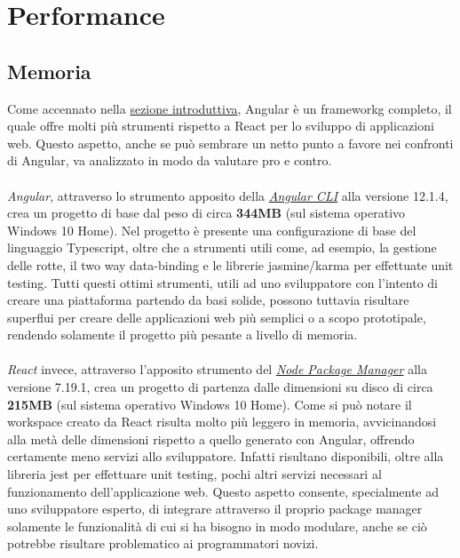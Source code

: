 
\section{Performance}
\label{subsec:performance}

\subsection{Memoria}
\label{sec:performance}
Come accennato nella \hyperref[sec:introduzione]{sezione introduttiva}, Angular è un \gls{frameworkg} completo, il quale offre molti più strumenti rispetto a React per lo sviluppo di applicazioni web. Questo aspetto, anche se può sembrare un netto punto a favore nei confronti di Angular, va analizzato in modo da valutare pro e contro. \\ \\
\textit{Angular}, attraverso lo strumento apposito della \hyperref[sec:linguaggio-programmazione]{\textsl{Angular CLI}} alla versione 12.1.4, crea un progetto di base dal peso di circa \textbf{344MB} (sul sistema operativo Windows 10 Home). Nel progetto è presente una configurazione di base del linguaggio Typescript, oltre che a strumenti utili come, ad esempio, la gestione delle rotte, il two way data-binding e le librerie jasmine/karma per effettuate unit testing. Tutti questi ottimi strumenti, utili ad uno sviluppatore con l'intento di creare una piattaforma partendo da basi solide, possono tuttavia risultare superflui per creare delle applicazioni web più semplici o a scopo prototipale, rendendo solamente il progetto più pesante a livello di memoria. \\ \\
\textit{React} invece, attraverso l'apposito strumento del \hyperref[sec:linguaggio-programmazione]{\textsl{Node Package Manager}} alla versione 7.19.1, crea un progetto di partenza dalle dimensioni su disco di circa \textbf{215MB} (sul sistema operativo Windows 10 Home). Come si può notare il workspace creato da React risulta molto più leggero in memoria, avvicinandosi alla metà delle dimensioni rispetto a quello generato con Angular, offrendo certamente meno servizi allo sviluppatore. Infatti risultano disponibili, oltre alla libreria jest per effettuare unit testing, pochi altri servizi necessari al funzionamento dell'applicazione web. Questo aspetto consente, specialmente ad uno sviluppatore esperto, di integrare attraverso il proprio package manager solamente le funzionalità di cui si ha bisogno in modo modulare, anche se ciò potrebbe risultare problematico ai programmatori novizi.


